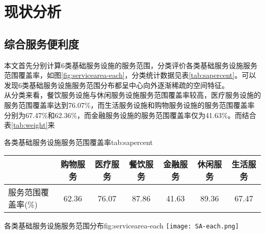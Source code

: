 \documentclass{shnuthesis}
\begin{document}
\section{现状分析}

\subsection{综合服务便利度}


本文首先分别计算6类基础服务设施的服务范围，分类评价各类基础服务设施服务范围覆盖率，如图\ref{fig:servicearea-each}，分类统计数据见表\ref{tab:sapercent}。可以发现6类基础服务设施服务范围分布都呈中心向外逐渐稀疏的空间特征。\\
\indent 从分类来看，餐饮服务设施与休闲服务设施服务范围覆盖率较高，医疗服务设施的服务范围覆盖率达到76.07\%，而生活服务设施和购物服务设施的服务范围覆盖率分别为67.47\%和62.36\%，而金融服务设施的服务范围覆盖率仅为41.63\%。而结合表\ref{tab:weight}来

\begin{generaltab}[htb]{各类基础服务设施服务范围覆盖率}{tab:sapercent}
	\renewcommand\arraystretch{1.2} %
	\begin{tabularx}{0.88\textwidth}{lcccccc}
		\toprule[1.5pt]
		& 购物服务        & 医疗服务       & 餐饮服务     & 金融服务     & 休闲服务     & 生活服务     \\
		\midrule
		服务范围覆盖率(\%) & 62.36 & 76.07 & 87.86 & 41.63 & 89.36 & 67.47	\\
		\bottomrule[1.5pt]
	\end{tabularx}
	\vspace{2em}
\end{generaltab}

\begin{generalfig}[H]{各类基础服务设施服务范围分布}{fig:servicearea-each}
	\texttt{[image: SA-each.png]}
\end{generalfig}
\end{document}
